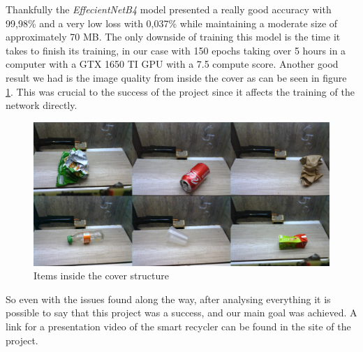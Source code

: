 \documentclass[a4paper,11pt]{article}
\begin{document}
Thankfully the \textit{EffecientNetB4} model presented a really good accuracy with 99,98\% and a very low loss with 0,037\% while maintaining a moderate size of approximately 70 MB. The only downside of training this model is the time it takes to finish its training, in our case with 150 epochs taking over 5 hours in a computer with a GTX 1650 TI GPU with a 7.5 compute score. Another good result we had is the image quality from inside the cover as can be seen in figure \ref{fig:itens}. This was crucial to the success of the project since it affects the training of the network directly.

\begin{figure}[H]
  \centering
  \includegraphics[width=12cm]{Figures/InsideCover.png}
  \caption{\small{Items inside the cover structure}}
  \label{fig:itens}
\end{figure}


So even with the issues found along the way, after analysing everything it is possible to say that this project was a success, and our main goal was achieved. A link for a presentation video of the smart recycler can be found in the site of the project\cite{blog}.




\end{document}
